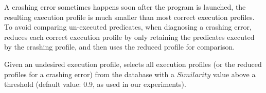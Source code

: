 







A crashing error sometimes happens soon after the program is launched,
the resulting execution profile is much smaller than
most correct execution profiles.
To avoid comparing un-executed predicates,
when diagnosing a crashing error, \ourtool
reduces each correct execution profile by only retaining
the predicates executed by the crashing profile, and then
uses the reduced profile for comparison. 


Given an undesired execution profile,
\ourtool selects all execution profiles (or the reduced profiles for
a crashing error) from the database
with a $Similarity$ value above a threshold (default value: 0.9, as used in our
experiments).


